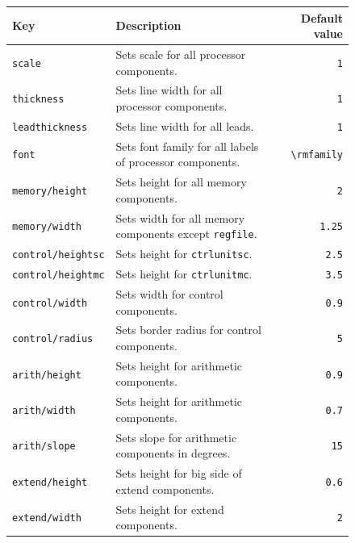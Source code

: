 \documentclass[10pt,a4paper]{scrartcl}
\begin{document}
\begin{figure}[htbp]
	\begin{tabularx}{\textwidth}{|lXr|}
		\hline
		Key                       & Description                                                           & Default value    \\
		\hline
		\texttt{scale}            & Sets scale for all processor components.                              & \texttt{1}       \\
		\texttt{thickness}        & Sets line width for all processor components.                         & \texttt{1}       \\
		\texttt{leadthickness}    & Sets line width for all leads.                                        & \texttt{1}       \\
		\texttt{font}             & Sets font family for all labels of processor components.              & \verb|\rmfamily| \\
		\texttt{memory/height}    & Sets height for all memory components.                                & \texttt{2}       \\
		\texttt{memory/width}     & Sets width for all memory components except \texttt{regfile}.         & \texttt{1.25}    \\
		\texttt{control/heightsc} & Sets height for \texttt{ctrlunitsc}.                                  & \texttt{2.5}     \\
		\texttt{control/heightmc} & Sets height for \texttt{ctrlunitmc}.                                  & \texttt{3.5}     \\
		\texttt{control/width}    & Sets width for control components.                                    & \texttt{0.9}     \\
		\texttt{control/radius}   & Sets border radius for control components.                            & \texttt{5}       \\
		\texttt{arith/height}     & Sets height for arithmetic components.                                & \texttt{0.9}     \\
		\texttt{arith/width}      & Sets height for arithmetic components.                                & \texttt{0.7}     \\
		\texttt{arith/slope}      & Sets slope for arithmetic components in degrees.                      & \texttt{15}      \\
		\texttt{extend/height}    & Sets height for big side of extend components.                        & \texttt{0.6}     \\
		\texttt{extend/width}     & Sets height for extend components.                                    & \texttt{2}       \\

\end{tabularx}
\end{figure}
\end{document}
